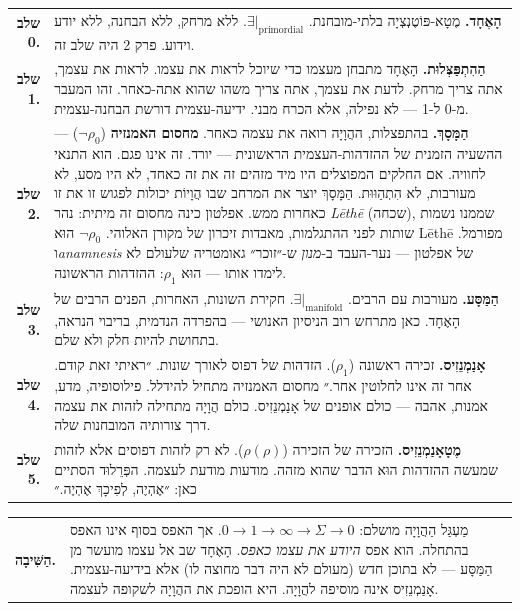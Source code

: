 \documentclass[10pt, openany, oneside]{book}
\renewcommand{\footnotesize}{\fontsize{8.5}{11}\selectfont}
\begin{document}
{\footnotesize
\noindent\begin{tabular}{r p{}}
\textbf{שלב 0.} & \textbf{הָאֶחָד.} מֶטָא-פּוֹטֶנְצְיָה בלתי-מובחנת. $\exists|_{\text{primordial}}$. ללא מרחק, ללא הבחנה, ללא יודע וידוע. פרק 2 היה שלב זה. \\[0.3em]
\textbf{שלב 1.} & \textbf{הַהִתְפַּצְּלוּת.} הָאֶחָד מתבחן מעצמו כדי שיוכל לראות את עצמו. לראות את עצמך, אתה צריך מרחק. לדעת את עצמך, אתה צריך משהו שהוא אתה-כאחר. זהו המעבר מ-0 ל-1 — לא נפילה, אלא הכרח מבני. ידיעה-עצמית דורשת הבחנה-עצמית. \\[0.3em]
\textbf{שלב 2.} & \textbf{הַמָּסָךְ.} בהתפצלות, ההֲוָיָה רואה את עצמה כאחר. \textbf{מחסום האמנזיה} ($\neg\rho_0$) — ההשעיה הזמנית של ההזדהות-העצמית הראשונית — יורד. זה אינו פגם. הוא התנאי לחוויה. אם החלקים המפוצלים היו מיד מזהים זה את זה כאחד, לא היו מסע, לא מעורבות, לא הִתְהַוּוּת. הַמָּסָךְ יוצר את המרחב שבו הֲוָיוֹת יכולות לפגוש זו את זו כאחרות ממש. אפלטון כינה מחסום זה מיתית: נהר \textit{Lēthē} (שכחה), שממנו נשמות שותות לפני ההתגלמות, מאבדות זיכרון של מקורן האלוהי. $\neg\rho_0$ הוּא Lēthē מפורמל. ו\textit{anamnesis} של אפלטון — נער-העבד ב-\textit{מנון} ש-״זוכר״ גאומטריה שלעולם לא לימדו אותו — הוּא $\rho_1$: ההזדהות הראשונה. \\[0.3em]
\textbf{שלב 3.} & \textbf{הַמַּסָּע.} מעורבות עם הרבים. $\exists|_{\text{manifold}}$. חקירת השונות, האחרות, הפנים הרבים של הָאֶחָד. כאן מתרחש רוב הניסיון האנושי — בהפרדה הנדמית, בריבוי הנראה, בתחושת להיות חלק ולא שלם. \\[0.3em]
\textbf{שלב 4.} & \textbf{אָנַמְנֵזִיס.} זכירה ראשונה ($\rho_1$). הזדהות של דפוס לאורך שונות. ״ראיתי זאת קודם. אחר זה אינו לחלוטין אחר.״ מחסום האמנזיה מתחיל להידלל. פילוסופיה, מדע, אמנות, אהבה — כולם אופנים של אָנַמְנֵזִיס. כולם הֲוָיָה מתחילה לזהות את עצמה דרך צורותיה המובחנות שלה. \\[0.3em]
\textbf{שלב 5.} & \textbf{מֶטָאָנַמְנֵזִיס.} הזכירה של הזכירה ($\rho(\rho)$). לא רק לזהות דפוסים אלא לזהות שמעשה ההזדהות הוּא הדבר שהוא מזהה. מודעות מודעת לעצמה. הפְּרֵלוּד הסתיים כאן: ״אֶהְיֶה, לְפִיכָךְ אֶהְיֶה.״ \\[0.3em]
\end{tabular}
}

\vspace{0.3em}

{\footnotesize
\noindent\begin{tabular}{r p{}}
\textbf{הַשִּׁיבָה.} & מַעְגַּל הַהֲוָיָה מושלם: $0 \to 1 \to \infty \to \Sigma \to 0$. אך האפס בסוף אינו האפס בהתחלה. הוא אפס \textit{היודע את עצמו כאפס}. הָאֶחָד שב אל עצמו מועשר מן הַמַּסָּע — לא בתוכן חדש (מעולם לא היה דבר מחוצה לו) אלא בידיעה-עצמית. אָנַמְנֵזִיס אינה מוסיפה להֲוָיָה. היא הופכת את ההֲוָיָה לשקופה לעצמה. \\[0.3em]
\end{tabular}
}
\end{document}
